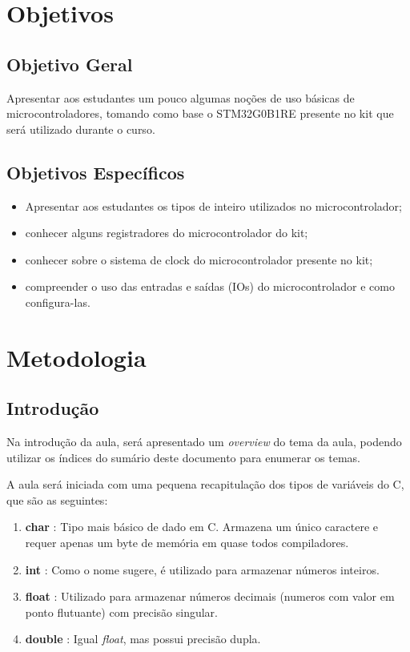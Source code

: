 \documentclass[12pt,a4paper]{report}
\begin{document}
\newpage

\chapter{Objetivos}

\section{Objetivo Geral}

Apresentar aos estudantes um pouco algumas noções de uso básicas de microcontroladores, tomando como base o STM32G0B1RE presente no kit que será utilizado durante o curso.

\section{Objetivos Específicos}

\begin{itemize}
    \item Apresentar aos estudantes os tipos de inteiro utilizados no microcontrolador;
    \item conhecer alguns registradores do microcontrolador do kit;
    \item conhecer sobre o sistema de clock do microcontrolador presente no kit;
    \item compreender o uso das entradas e saídas (IOs) do microcontrolador e como configura-las.
\end{itemize}


\chapter{Metodologia}

\section{Introdução}

Na introdução da aula, será apresentado um \textit{overview} do tema da aula, podendo utilizar os índices do sumário deste documento para enumerar os temas.

A aula será iniciada com uma pequena recapitulação dos tipos de variáveis do C, que são as seguintes:

\begin{enumerate}
    \item \textbf{char} : Tipo mais básico de dado em C. Armazena um único caractere e requer apenas um byte de memória em quase todos compiladores.
    \item \textbf{int} : Como o nome sugere, é utilizado para armazenar números inteiros.
    \item \textbf{float} : Utilizado para armazenar números decimais (numeros com valor em ponto flutuante) com precisão singular.
    \item \textbf{double} : Igual \textit{float}, mas possui precisão dupla.
\end{enumerate}
\end{document}
